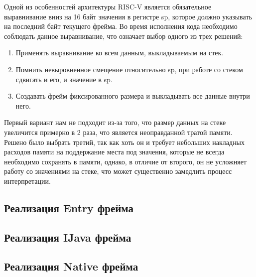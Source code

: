     Одной из особенностей архитектуры RISC-V является обязательное выравнивание вниз на 16 байт значения в регистре sp, которое должно указывать на последний байт текущего фрейма. Во время исполнения кода необходимо соблюдать данное выравнивание, что означает выбор одного из трех решений:
\begin{enumerate}
    \item Применять выравнивание ко всем данным, выкладываемым на стек.
    \item Помнить невыровненное смещение относительно sp, при работе со стеком сдвигать и его, и значение в sp.
    \item Создавать фрейм фиксированного размера и выкладывать все данные внутри него.
\end{enumerate}

Первый вариант нам не подходит из-за того, что размер данных на стеке увеличится примерно в 2 раза, что является неоправданной тратой памяти. Решено было выбрать третий, так как хоть он и требует небольших накладных расходов памяти на поддержание места под значения, которые не всегда необходимо сохранять в памяти, однако, в отличие от второго, он не усложняет работу со значениями на стеке, что может существенно замедлить процесс интерпретации.



\subsection{Реализация Entry фрейма}



\subsection{Реализация IJava фрейма}
\subsection{Реализация Native фрейма}